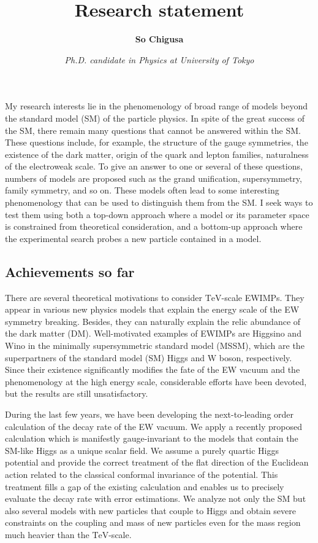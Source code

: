 \documentclass[12pt,notitlepage]{book}
\title{\vspace*{-3cm}Research statement}
\author{\textbf{So Chigusa}}
\date{\vspace*{-4mm}\textit{Ph.D. candidate in Physics at University of Tokyo}}
\begin{document}
\maketitle

My research interests lie in the phenomenology of broad range of models beyond the standard model (SM) of the particle physics.
In spite of the great success of the SM, there remain many questions that cannot be answered within the SM.
These questions include, for example, the structure of the gauge symmetries, the existence of the dark matter, origin of the quark and lepton families, naturalness of the electroweak scale.
To give an answer to one or several of these questions, numbers of models are proposed such as the grand unification, supersymmetry, family symmetry, and so on.
These models often lead to some interesting phenomenology that can be used to distinguish them from the SM.
I seek ways to test them using both a top-down approach where a model or its parameter space is constrained from theoretical consideration, and a bottom-up approach where the experimental search probes a new particle contained in a model.

\vspace*{-2mm}
\subsection*{Achievements so far}

There are several theoretical motivations to consider
$\mathrm{TeV}$-scale EWIMPs.  They appear in various new physics models
that explain the energy scale of the EW symmetry breaking.  Besides,
they can naturally explain the relic abundance of the dark matter (DM).
Well-motivated examples of EWIMPs are Higgsino and Wino in the minimally
supersymmetric standard model (MSSM), which are the superpartners of the
standard model (SM) Higgs and W boson, respectively.  Since their
existence significantly modifies the fate of the EW vacuum and the
phenomenology at the high energy scale, considerable efforts have been
devoted, but the results are still unsatisfactory.

During the last few years, we have been developing the next-to-leading
order calculation of the decay rate of the EW vacuum.  We apply a
recently proposed calculation which is manifestly gauge-invariant to the
models that contain the SM-like Higgs as a unique scalar field.  We
assume a purely quartic Higgs potential and provide the correct
treatment of the flat direction of the Euclidean action related to the
classical conformal invariance of the potential.  This treatment fills a
gap of the existing calculation and enables us to precisely evaluate the
decay rate with error estimations.  We analyze not only the SM but also
several models with new particles that couple to Higgs and obtain severe
constraints on the coupling and mass of new particles even for the mass
region much heavier than the $\mathrm{TeV}$-scale.
\end{document}
